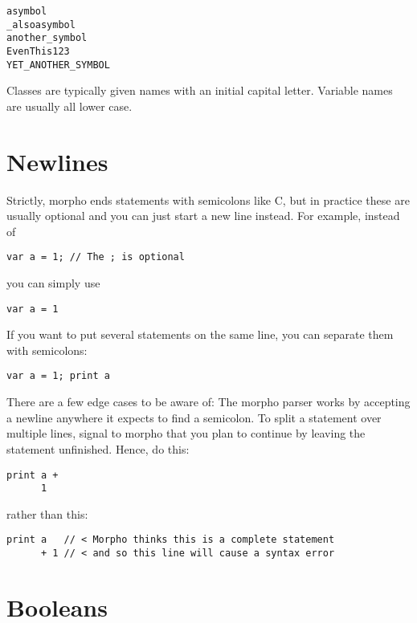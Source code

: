 \begin{lstlisting}
asymbol
_alsoasymbol
another_symbol
EvenThis123
YET_ANOTHER_SYMBOL
\end{lstlisting}

Classes are typically given names with an initial capital letter.
Variable names are usually all lower case.

\hypertarget{newlines}{%
\section{Newlines}\label{newlines}}

Strictly, morpho ends statements with semicolons like C, but in practice
these are usually optional and you can just start a new line instead.
For example, instead of

\begin{lstlisting}
var a = 1; // The ; is optional
\end{lstlisting}

you can simply use

\begin{lstlisting}
var a = 1
\end{lstlisting}

If you want to put several statements on the same line, you can separate
them with semicolons:

\begin{lstlisting}
var a = 1; print a
\end{lstlisting}

There are a few edge cases to be aware of: The morpho parser works by
accepting a newline anywhere it expects to find a semicolon. To split a
statement over multiple lines, signal to morpho that you plan to
continue by leaving the statement unfinished. Hence, do this:

\begin{lstlisting}
print a +
      1
\end{lstlisting}

rather than this:

\begin{lstlisting}
print a   // < Morpho thinks this is a complete statement
      + 1 // < and so this line will cause a syntax error
\end{lstlisting}

\hypertarget{booleans}{%
\section{Booleans}\label{booleans}}

